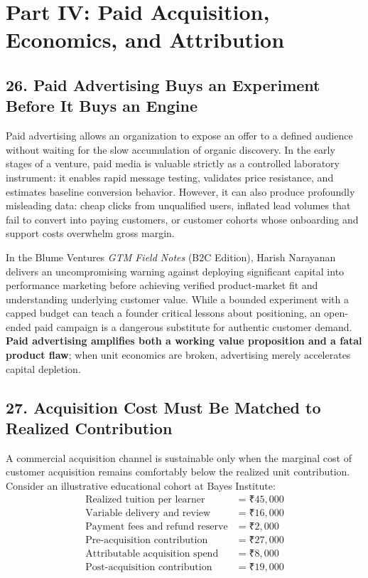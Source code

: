 \section*{Part IV: Paid Acquisition, Economics, and Attribution}

\subsection*{26. Paid Advertising Buys an Experiment Before It Buys an Engine}

Paid advertising allows an organization to expose an offer to a defined audience without waiting for the slow accumulation of organic discovery. In the early stages of a venture, paid media is valuable strictly as a controlled laboratory instrument: it enables rapid message testing, validates price resistance, and estimates baseline conversion behavior. However, it can also produce profoundly misleading data: cheap clicks from unqualified users, inflated lead volumes that fail to convert into paying customers, or customer cohorts whose onboarding and support costs overwhelm gross margin.

In the Blume Ventures \textit{GTM Field Notes} (B2C Edition), Harish Narayanan delivers an uncompromising warning against deploying significant capital into performance marketing before achieving verified product-market fit and understanding underlying customer value. While a bounded experiment with a capped budget can teach a founder critical lessons about positioning, an open-ended paid campaign is a dangerous substitute for authentic customer demand. \textbf{Paid advertising amplifies both a working value proposition and a fatal product flaw}; when unit economics are broken, advertising merely accelerates capital depletion.

\subsection*{27. Acquisition Cost Must Be Matched to Realized Contribution}

A commercial acquisition channel is sustainable only when the marginal cost of customer acquisition remains comfortably below the realized unit contribution. Consider an illustrative educational cohort at Bayes Institute:
\begin{align*}
  \text{Realized tuition per learner} &= \text{₹}45,000 \\
  \text{Variable delivery and review} &= \text{₹}16,000 \\
  \text{Payment fees and refund reserve} &= \text{₹}2,000 \\
  \hline
  \text{Pre-acquisition contribution} &= \text{₹}27,000 \\
  \text{Attributable acquisition spend} &= \text{₹}8,000 \\
  \hline
  \text{Post-acquisition contribution} &= \text{₹}19,000
\end{align*}

